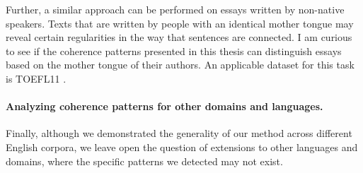 Further, a similar approach can be performed on essays written by non-native speakers. 
Texts that are written by people with an identical mother tongue may reveal certain regularities in the way that sentences are connected. 
I am curious to see if the coherence patterns presented in this thesis can distinguish essays based on the mother tongue of their authors. 
An applicable dataset for this task is TOEFL11 \cite{blanchard11}. 

\paragraph{Analyzing coherence patterns for other domains and languages.}
Finally, although we demonstrated the generality of our method across different English corpora, we leave open the question of extensions to other languages and domains, where the specific patterns we detected may not exist. 





